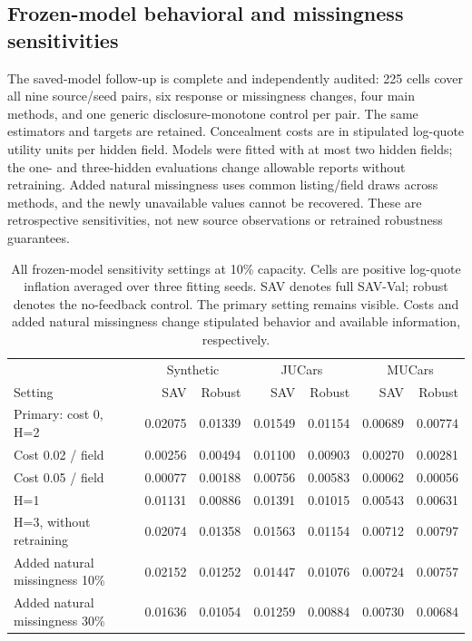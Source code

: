 \documentclass[10pt,journal]{IEEEtran}
\begin{document}
\subsection{Frozen-model behavioral and missingness sensitivities}
The saved-model follow-up is complete and independently audited: 225 cells
cover all nine source/seed pairs, six response or missingness changes,
four main methods, and one generic disclosure-monotone control per pair.
The same estimators and targets are retained. Concealment costs are in
stipulated log-quote utility units per hidden field. Models were fitted
with at most two hidden fields; the one- and three-hidden evaluations
change allowable reports without retraining. Added natural missingness
uses common listing/field draws across methods, and the newly unavailable
values cannot be recovered. These are retrospective sensitivities,
not new source observations or retrained robustness guarantees.

\begin{table}[t]
\centering\small
\setlength{\tabcolsep}{4pt}
\caption{All frozen-model sensitivity settings at 10\% capacity. Cells
are positive log-quote inflation averaged over three fitting seeds.
SAV denotes full SAV-Val; robust denotes the no-feedback control.
The primary setting remains visible. Costs and added natural missingness
change stipulated behavior and available information, respectively.}
\label{tab:frozen_sensitivities}
\begin{tabular}{lrrrrrr}
\toprule
& \multicolumn{2}{c}{Synthetic} & \multicolumn{2}{c}{JUCars} & \multicolumn{2}{c}{MUCars}\\
Setting & SAV & Robust & SAV & Robust & SAV & Robust\\
\midrule
Primary: cost 0, H=2 & 0.02075 & 0.01339 & 0.01549 & 0.01154 & 0.00689 & 0.00774\\
Cost 0.02 / field & 0.00256 & 0.00494 & 0.01100 & 0.00903 & 0.00270 & 0.00281\\
Cost 0.05 / field & 0.00077 & 0.00188 & 0.00756 & 0.00583 & 0.00062 & 0.00056\\
H=1 & 0.01131 & 0.00886 & 0.01391 & 0.01015 & 0.00543 & 0.00631\\
H=3, without retraining & 0.02074 & 0.01358 & 0.01563 & 0.01154 & 0.00712 & 0.00797\\
Added natural missingness 10\% & 0.02152 & 0.01252 & 0.01447 & 0.01076 & 0.00724 & 0.00757\\
Added natural missingness 30\% & 0.01636 & 0.01054 & 0.01259 & 0.00884 & 0.00730 & 0.00684\\
\bottomrule
\end{tabular}
\end{table}
\end{document}

